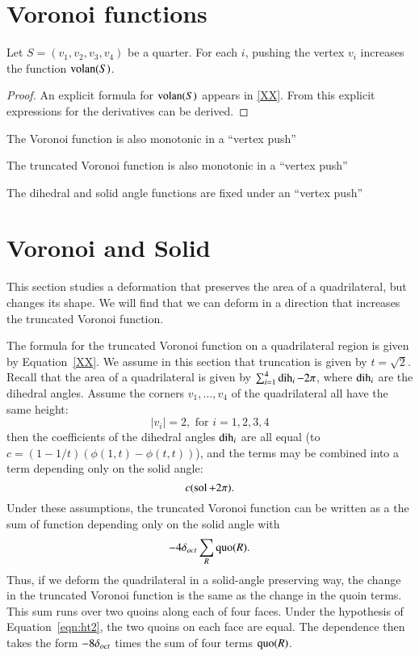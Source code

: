 \section{Voronoi functions}

\begin{lemma}  Let $S= (v_1,v_2,v_3,v_4)$ be a quarter.  For each $i$,
pushing the vertex $v_i$ increases the function ${\operatorname{volan}}(S)$.
\end{lemma}

\begin{proof}  An explicit formula for ${\operatorname{volan}}(S)$ appears in
\ref{XX}.  From this explicit expressions for the derivatives can
be derived.
\end{proof}


The Voronoi function is also monotonic in a ``vertex push''


The truncated Voronoi function is also monotonic in a ``vertex
push''

The dihedral and solid angle functions are fixed under an ``vertex
push''


\section{Voronoi and Solid}

This section studies a deformation that preserves the area of a
quadrilateral, but changes its shape.  We will find that we can
deform in a direction that increases the truncated Voronoi
function.

The formula for the truncated Voronoi function on a quadrilateral
region is given by Equation~\ref{XX}.  We assume in this section
that truncation is given by $t=\sqrt2$.  Recall that the area of a
quadrilateral is given by $\sum_{i=1}^4 \operatorname{dih}_i - 2\pi$, where
$\operatorname{dih}_i$ are the dihedral angles.  Assume the corners
$v_1,\ldots,v_4$ of the quadrilateral all have the same height:
    \begin{equation}\label{eqn:ht2}
    |v_i| = 2,\text{ for } i=1,2,3,4
    \end{equation}
then the coefficients of the dihedral angles ${\operatorname{dih}}_i$ are all
equal (to $c=(1-1/t)(\phi(1,t)-\phi(t,t))$), and the terms may be
combined into a term depending only on the solid angle:
    $$c (\operatorname{sol} + 2\pi).$$
Under these assumptions, the truncated Voronoi function can be
written as a the sum of function depending only on the solid angle
with
    $$
    -4 \delta_{oct} \sum_R \operatorname{quo}(R).
    $$
Thus, if we deform the quadrilateral in a solid-angle preserving
way, the change in the truncated Voronoi function is the same as
the change in the quoin terms.  This sum runs over two quoins
along each of four faces.  Under the hypothesis of
Equation~\ref{eqn:ht2}, the two quoins on each face are equal. The
dependence then takes the form $-8\delta_{oct}$ times the sum of four
terms $\operatorname{quo}(R)$.

